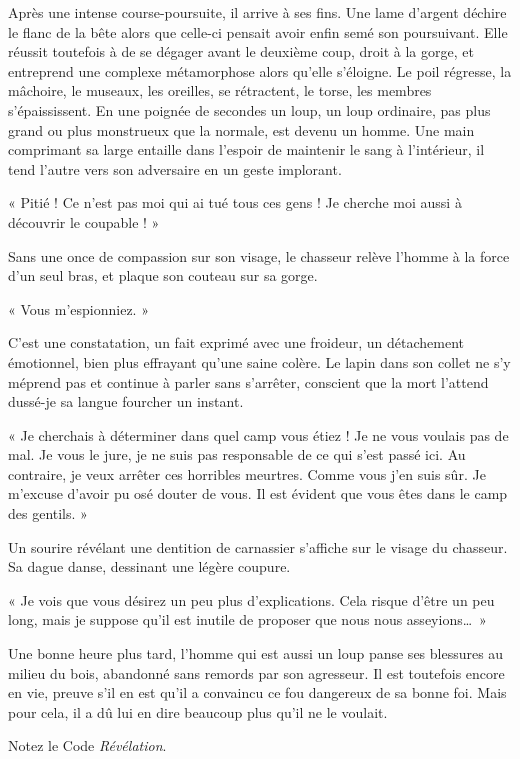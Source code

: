 \documentclass{report}
\begin{document}
Après une intense course-poursuite, il arrive à ses fins. Une lame d'argent déchire le flanc de la bête alors que celle-ci pensait avoir enfin semé son poursuivant. Elle réussit toutefois à de se dégager avant le deuxième coup, droit à la gorge, et entreprend une complexe métamorphose alors qu'elle s'éloigne. Le poil régresse, la mâchoire, le museaux, les oreilles, se rétractent, le torse, les membres s'épaississent. En une poignée de secondes un loup, un loup ordinaire, pas plus grand ou plus monstrueux que la normale, est devenu un homme. Une main comprimant sa large entaille dans l'espoir de maintenir le sang à l'intérieur, il tend l'autre vers son adversaire en un geste implorant.

« Pitié ! Ce n'est pas moi qui ai tué tous ces gens ! Je cherche moi aussi à découvrir le coupable ! »

Sans une once de compassion sur son visage, le chasseur relève l'homme à la force d'un seul bras, et plaque son couteau sur sa gorge.

« Vous m'espionniez. » 

C'est une constatation, un fait exprimé avec une froideur, un détachement émotionnel, bien plus effrayant qu'une saine colère. Le lapin dans son collet ne s'y méprend pas et continue à parler sans s'arrêter, conscient que la mort l'attend dussé-je sa langue fourcher un instant.

« Je cherchais à déterminer dans quel camp vous étiez ! Je ne vous voulais pas de mal. Je vous le jure, je ne suis pas responsable de ce qui s'est passé ici. Au contraire, je veux arrêter ces horribles meurtres. Comme vous j'en suis sûr. Je m'excuse d'avoir pu osé douter de vous. Il est évident que vous êtes dans le camp des gentils. »

Un sourire révélant une dentition de carnassier s'affiche sur le visage du chasseur. Sa dague danse, dessinant une légère coupure.

« Je vois que vous désirez un peu plus d'explications. Cela risque d'être un peu long, mais je suppose qu'il est inutile de proposer que nous nous asseyions\dots~» 

Une bonne heure plus tard, l'homme qui est aussi un loup panse ses blessures au milieu du bois, abandonné sans remords par son agresseur. Il est toutefois encore en vie, preuve s'il en est qu'il a convaincu ce fou dangereux de sa bonne foi. Mais pour cela, il a dû lui en dire beaucoup plus qu'il ne le voulait.

Notez le Code \emph{Révélation}.
\end{document}

